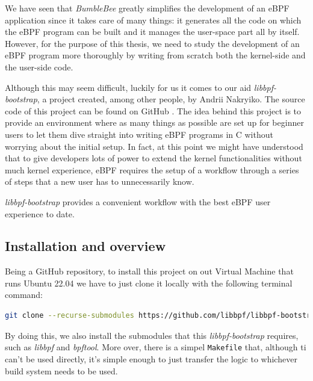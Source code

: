



We have seen that \textit{BumbleBee} greatly simplifies the development of an eBPF application since it takes care of many things: it generates all the code on which the eBPF program can be built and it manages the user-space part all by itself.
However, for the purpose of this thesis, we need to study the development of an eBPF program more thoroughly by writing from scratch both the kernel-side and the user-side code.

Although this may seem difficult, luckily for us it comes to our aid \textit{libbpf-bootstrap}, a project created, among other people, by Andrii Nakryiko.
The source code of this project can be found on GitHub \cite{libbpfbootstrapGithubRepo}.
The idea behind this project is to provide an environment where as many things as possible are set up for beginner users to let them dive straight into writing eBPF programs in C without worrying about the initial setup.
In fact, at this point we might have understood that to give developers lots of power to extend the kernel functionalities without much kernel experience, eBPF requires the setup of a workflow through a series of steps that a new user has to unnecessarily know.

\textit{libbpf-bootstrap} provides a convenient workflow with the best eBPF user experience to date.

\subsection{Installation and overview}

Being a GitHub repository, to install this project on out Virtual Machine that runs Ubuntu 22.04 we have to just clone it locally with the following terminal command:

\begin{lstlisting}[language=bash, caption={libbpf-bootstrap clone command}]
	git clone --recurse-submodules https://github.com/libbpf/libbpf-bootstrap
\end{lstlisting}

By doing this, we also install the submodules that this \textit{libbpf-bootstrap} requires, such as  \textit{libbpf} and \textit{bpftool}.
More over, there is a simpel \verb|Makefile| that, although ti can't be used directly, it's simple enough to just transfer the logic to whichever build system needs to be used.

